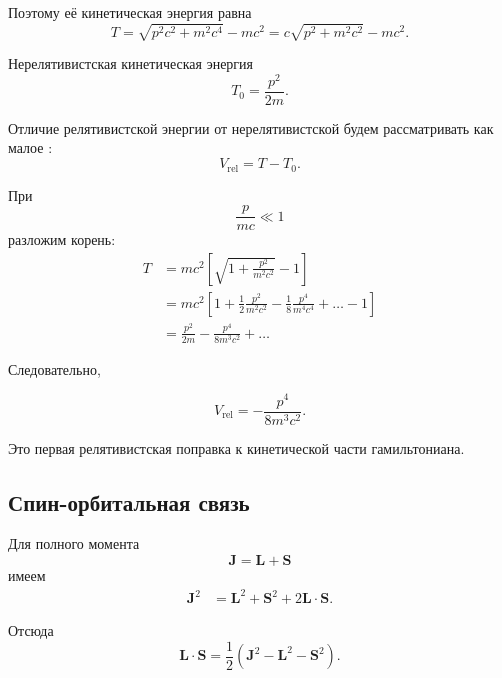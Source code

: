 \documentclass[../final.tex]{subfiles}
\begin{document}
Поэтому её кинетическая энергия равна
%
\begin{equation*}
    T
    =
    \sqrt{p^2c^2+m^2c^4}
    -
    mc^2
    =
    c\sqrt{p^2+m^2c^2}-mc^2.
\end{equation*}

Нерелятивистская кинетическая энергия
%
\begin{equation*}
    T_0
    =
    \frac{p^2}{2m}.
\end{equation*}

Отличие релятивистской энергии от нерелятивистской будем рассматривать
как малое :
%
\begin{equation*}
    V_{\mathrm{rel}}
    =
    T-T_0.
\end{equation*}

При
%
\[
    \frac{p}{mc}\ll1
\]
%
разложим корень:
%
\begin{align*}
    T
    &=
    mc^2
    \left[
        \sqrt{
            1+\frac{p^2}{m^2c^2}
        }
        -1
    \right]
    \\[4pt]
    &=
    mc^2
    \left[
        1
        +
        \frac{1}{2}\frac{p^2}{m^2c^2}
        -
        \frac{1}{8}
        \frac{p^4}{m^4c^4}
        +\ldots
        -1
    \right]
    \\[4pt]
    &=
    \frac{p^2}{2m}
    -
    \frac{p^4}{8m^3c^2}
    +\ldots
\end{align*}

Следовательно,

\[
    V_{\mathrm{rel}}
    =
    -\frac{p^4}{8m^3c^2}.
\]

Это первая релятивистская поправка к кинетической части
гамильтониана.


\subsection{Спин-орбитальная связь}

Для полного момента
%
\begin{equation*}
    \mathbf J
    =
    \mathbf L+\mathbf S
\end{equation*}
%
имеем
%
\begin{align*}
    \mathbf J^2
    &=
    \mathbf L^2
    +
    \mathbf S^2
    +
    2\mathbf L\cdot\mathbf S.
\end{align*}

Отсюда
%
\begin{equation*}
    \mathbf L\cdot\mathbf S
    =
    \frac{1}{2}
    \left(
        \mathbf J^2
        -
        \mathbf L^2
        -
        \mathbf S^2
    \right).
\end{equation*}
\end{document}
